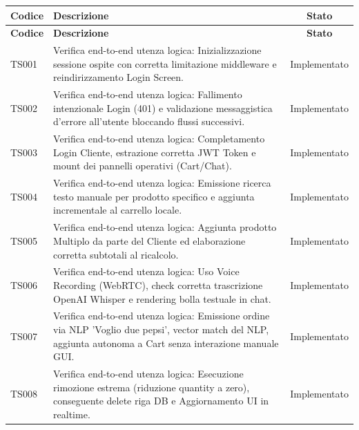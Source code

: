 \documentclass[a4paper,11pt,oneside]{scrartcl}
\begin{document}
\begin{longtable}{|p{1.9cm}|p{11.6cm}|c|}
    \hline
    \rowcolor[gray]{0.9}
    \textbf{Codice} & \textbf{Descrizione}                                                                                                                                            & \textbf{Stato} \\
    \hline
    \endfirsthead
    \hline
    \rowcolor[gray]{0.9}
    \textbf{Codice} & \textbf{Descrizione}                                                                                                                                            & \textbf{Stato} \\
    \hline
    \endhead
    TS001           & Verifica end-to-end utenza logica: Inizializzazione sessione ospite con corretta limitazione middleware e reindirizzamento Login Screen.                        & Implementato   \\ \hline
    TS002           & Verifica end-to-end utenza logica: Fallimento intenzionale Login (401) e validazione messaggistica d'errore all'utente bloccando flussi successivi.             & Implementato   \\ \hline
    TS003           & Verifica end-to-end utenza logica: Completamento Login Cliente, estrazione corretta JWT Token e mount dei pannelli operativi (Cart/Chat).                       & Implementato   \\ \hline
    TS004           & Verifica end-to-end utenza logica: Emissione ricerca testo manuale per prodotto specifico e aggiunta incrementale al carrello locale.                           & Implementato   \\ \hline
    TS005           & Verifica end-to-end utenza logica: Aggiunta prodotto Multiplo da parte del Cliente ed elaborazione corretta subtotali al ricalcolo.                             & Implementato   \\ \hline
    TS006           & Verifica end-to-end utenza logica: Uso Voice Recording (WebRTC), check corretta trascrizione OpenAI Whisper e rendering bolla testuale in chat.                 & Implementato   \\ \hline
    TS007           & Verifica end-to-end utenza logica: Emissione ordine via NLP 'Voglio due pepsi', vector match del NLP, aggiunta autonoma a Cart senza interazione manuale GUI.   & Implementato   \\ \hline
    TS008           & Verifica end-to-end utenza logica: Esecuzione rimozione estrema (riduzione quantity a zero), conseguente delete riga DB e Aggiornamento UI in realtime.         & Implementato   \\ \hline

\end{longtable}
\end{document}
